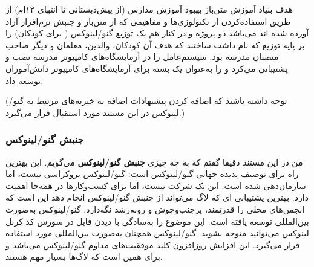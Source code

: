 \begin{itemize}
هدف بنیاد آموزش متن‌باز بهبود آموزش مدارس (از پیش‌دبستانی تا انتهای ۱۲ام)
از طریق استفاده‌کردن از تکنولوژی‌ها و مفاهیمی که از متن‌باز و جنبش نرم‌افزار آزاد
آورده شده اند می‌باشد.دو پروژه  و  در کنار هم یک توزیع گنو/لینوکس
(
برای کودکان) را بر پایه توزیع
که
نام داشت ساختند که هدف آن کودکان، والدین، معلمان و دیگر صاحب منصبان مدرسه بود.
سیستم‌عامل را در آزمایشگاه‌های کامپیوتر مدرسه نصب و پشتیبانی می‌کرد و
را به‌عنوان یک بسته
برای آزمایشگاه‌های کامپیوتر دانش‌آموزان توسعه داد.

\end{itemize}

(توجه داشته باشید که اضافه کردن پیشنهادات اضافه به خیریه‌های
مرتبط به گنو/لینوکس در این مستند مورد استقبال قرار می‌گیرد.)

\subsubsection{جنبش گنو/لینوکس}

من در این مستند دقیقا گفتم که به چه چیزی 
{\bfseries جنبش گنو/لینوکس}
می‌گویم. این بهترین راه برای توصیف پدیده جهانی گنو/لینوکس است:
گنو/لینوکس بروکراسی نیست، اما سازمان‌دهی شده است. این یک شرکت نیست،
اما برای کسب‌وکارها در همه‌جا اهمیت دارد. بهترین پشتیبانی ای که لاگ
می‌تواند از جنبش گنو/لینوکس انجام دهد این است که انجمن‌های محلی را قدرتمند،
پرجنب‌وجوش و روبه‌رشد نگه‌دارد.
گنو/لینوکس به‌صورت بین‌المللی توسعه یافته است. این موضوع را به‌سادگی
با دیدن فایل  در سورس کد کرنل لینوکس می‌توانید متوجه بشوید.
گنو/لینوکس همچنان به‌صورت بین‌المللی مورد استفاده قرار می‌گیرد.
این افزایش روزافزون
کلید موفقیت‌های مداوم گنو/لینوکس می‌باشد و برای همین است که لاگ‌ها بسیار مهم هستند.

